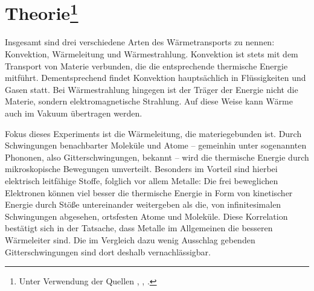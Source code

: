 \section{Theorie\footnote{Unter Verwendung der Quellen \cite{demtroeder}, \cite{anleitung204}, \cite{gerthsen}.}}
\label{sec:Theorie}
Insgesamt sind drei verschiedene Arten des Wärmetransports zu nennen: Konvektion, Wärmeleitung und Wärmestrahlung. 
Konvektion ist stets mit dem Transport von Materie verbunden, die die entsprechende thermische Energie mitführt. 
Dementsprechend findet Konvektion hauptsächlich in Flüssigkeiten und Gasen statt.
Bei Wärmestrahlung hingegen ist der Träger der Energie nicht die Materie, sondern elektromagnetische Strahlung. 
Auf diese Weise kann Wärme auch im Vakuum übertragen werden. 

Fokus dieses Experiments ist die Wärmeleitung, die materiegebunden ist. 
Durch Schwingungen benachbarter Moleküle und Atome -- gemeinhin unter sogenannten Phononen, also
Gitterschwingungen, bekannt -- wird die thermische Energie durch mikroskopische Bewegungen umverteilt.
Besonders im Vorteil sind hierbei elektrisch leitfähige Stoffe, folglich vor allem Metalle: Die frei beweglichen Elektronen 
können viel besser die thermische Energie in Form von kinetischer Energie durch 
Stöße untereinander weitergeben als die, von infinitesimalen Schwingungen abgesehen, ortsfesten Atome und Moleküle. 
Diese Korrelation bestätigt sich in der Tatsache, dass Metalle im Allgemeinen die besseren Wärmeleiter sind. 
Die im Vergleich dazu wenig Ausschlag gebenden Gitterschwingungen sind dort deshalb vernachlässigbar.

